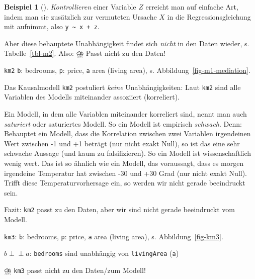 \documentclass[
  ngerman,
  letterpaper,
  twoside,
  open=any]{scrbook}
\theoremstyle{definition}
\newtheorem{example}{Beispiel}[chapter]
\theoremstyle{plain}
\theoremstyle{definition}
\theoremstyle{definition}
\theoremstyle{remark}
\begin{document}
\begin{example}[]
\emph{Kontrollieren} einer Variable \(Z\) erreicht man auf einfache Art,
indem man sie zusätzlich zur vermuteten Ursache \(X\) in die
Regressionsgleichung mit aufnimmt, also
\texttt{y\ \textasciitilde{}\ x\ +\ z}.

Aber diese behauptete Unabhängigkeit findet sich \emph{nicht} in den
Daten wieder, s. Tabelle~\ref{tbl-m2}. Also: ⛈️ Passt nicht zu den
Daten!

\texttt{km2} \texttt{b}: bedrooms, \texttt{p}: price, \texttt{a} area
(living area), s. Abbildung~\ref{fig-m1-mediation}.

Das Kausalmodell \texttt{km2} postuliert \emph{keine} Unabhängigkeiten:
Laut \texttt{km2} sind alle Variablen des Modells miteinander assoziiert
(korreliert).

\begin{tcolorbox}[enhanced jigsaw, arc=.35mm, bottomrule=.15mm, bottomtitle=1mm, breakable, colback=white, colbacktitle=quarto-callout-note-color!10!white, colframe=quarto-callout-note-color-frame, coltitle=black, left=2mm, leftrule=.75mm, opacityback=0, opacitybacktitle=0.6, rightrule=.15mm, title=\textcolor{quarto-callout-note-color}{\faInfo}\hspace{0.5em}{Hinweis}, titlerule=0mm, toprule=.15mm, toptitle=1mm]

Ein Modell, in dem alle Variablen miteinander korreliert sind, nennt man
auch \emph{saturiert} oder saturiertes Modell. So ein Modell ist
empirisch \emph{schwach}. Denn: Behauptet ein Modell, dass die
Korrelation zwischen zwei Variablen irgendeinen Wert zwischen -1 und +1
beträgt (nur nicht exakt Null), so ist das eine sehr schwache Aussage
(und kaum zu falsifizieren). So ein Modell ist wissenschaftlich wenig
wert. Das ist so ähnlich wie ein Modell, das voraussagt, dass es morgen
irgendeine Temperatur hat zwischen -30 und +30 Grad (nur nicht exakt
Null). Trifft diese Temperaturvorhersage ein, so werden wir nicht gerade
beeindruckt sein. 🥱

\end{tcolorbox}

Fazit: \texttt{km2} passt zu den Daten, aber wir sind nicht gerade
beeindruckt vom Modell.

\texttt{km3}: \texttt{b}: bedrooms, \texttt{p}: price, \texttt{a} area
(living area), s. Abbildung~\ref{fig-km3}.

\(b \perp \!\!\! \perp a\): \texttt{bedrooms} sind unabhängig von
\texttt{livingArea} (\texttt{a})

⛈️ \texttt{km3} passt nicht zu den Daten/zum Modell!


\end{example}
\end{document}
